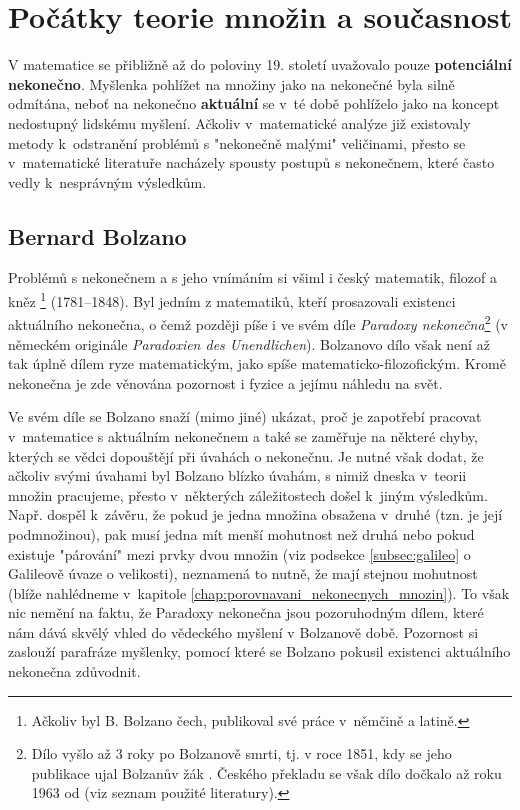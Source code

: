 \section{Počátky teorie množin a současnost}

V matematice se přibližně až do poloviny 19. století uvažovalo pouze \textbf{potenciální nekonečno}. Myšlenka pohlížet na množiny jako na nekonečné byla silně odmítána, neboť na nekonečno \textbf{aktuální} se v~té době pohlíželo jako na koncept nedostupný lidskému myšlení. Ačkoliv v~matematické analýze již existovaly metody k~odstranění problémů s "nekonečně malými" veličinami, přesto se v~matematické literatuře nacházely spousty postupů s nekonečnem, které často vedly k~nesprávným výsledkům.
\subsection{Bernard Bolzano}\label{subsec:bolzano}
Problémů s nekonečnem a s jeho vnímáním si všiml i český matematik, filozof a kněz \footnote{Ačkoliv byl B. Bolzano čech, publikoval své práce v~němčině a latině.} (1781--1848). Byl jedním z matematiků, kteří prosazovali existenci aktuálního nekonečna, o čemž později píše i ve svém díle \emph{Paradoxy nekonečna}\footnote{Dílo vyšlo až 3 roky po Bolzanově smrti, tj. v roce 1851, kdy se jeho publikace ujal Bolzanův žák . Českého překladu se však dílo dočkalo až roku 1963 od  (viz seznam použité literatury).} (v německém originále \emph{Paradoxien des Unendlichen}). Bolzanovo dílo však není až tak úplně dílem ryze matematickým, jako spíše matematicko-filozofickým. Kromě nekonečna je zde věnována pozornost i fyzice a jejímu náhledu na svět.\par
Ve svém díle se Bolzano snaží (mimo jiné) ukázat, proč je zapotřebí pracovat v~matematice s aktuálním nekonečnem a také se zaměřuje na některé chyby, kterých se vědci dopouštějí při úvahách o nekonečnu. Je nutné však dodat, že ačkoliv svými úvahami byl Bolzano blízko úvahám, s nimiž dneska v~teorii množin pracujeme, přesto v~některých záležitostech došel k~jiným výsledkům. Např. dospěl k~závěru, že pokud je jedna množina obsažena v~druhé (tzn. je její podmnožinou), pak musí jedna mít menší mohutnost než druhá nebo pokud existuje "párování" mezi prvky dvou množin (viz podsekce \ref{subsec:galileo}
o Galileově úvaze o velikosti), neznamená to nutně, že mají stejnou mohutnost (blíže nahlédneme v~kapitole \ref{chap:porovnavani_nekonecnych_mnozin}). To však nic nemění na faktu, že Paradoxy nekonečna jsou pozoruhodným dílem, které nám dává skvělý vhled do vědeckého myšlení v Bolzanově době. Pozornost si zaslouží parafráze myšlenky, pomocí které se Bolzano pokusil existenci aktuálního nekonečna zdůvodnit.

